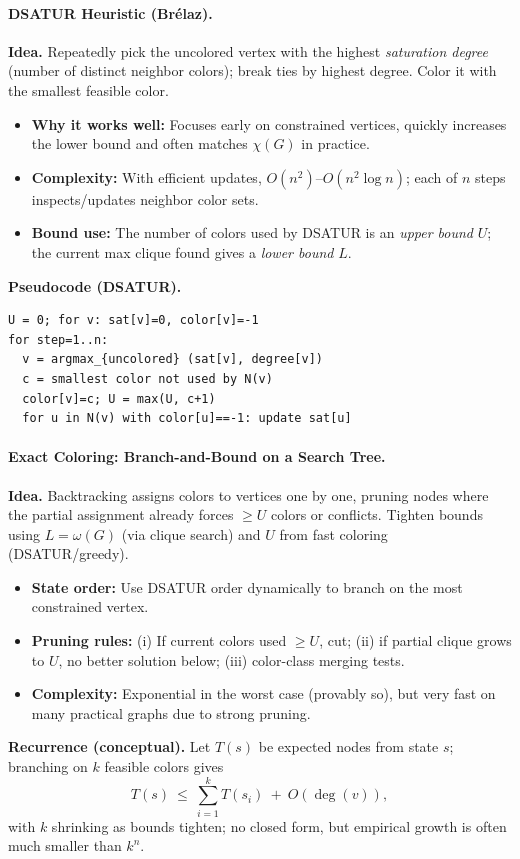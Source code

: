 \documentclass[9pt]{extarticle}
\begin{document}
\paragraph{DSATUR Heuristic (Brélaz).}
\textbf{Idea.} Repeatedly pick the uncolored vertex with the highest \emph{saturation degree} (number of distinct neighbor colors); break ties by highest degree. Color it with the smallest feasible color.
\begin{itemize}
  \item \textbf{Why it works well:} Focuses early on constrained vertices, quickly increases the lower bound and often matches $\chi(G)$ in practice.
  \item \textbf{Complexity:} With efficient updates, $O(n^2)$–$O(n^2 \log n)$; each of $n$ steps inspects/updates neighbor color sets.
  \item \textbf{Bound use:} The number of colors used by DSATUR is an \emph{upper bound} $U$; the current max clique found gives a \emph{lower bound} $L$.
\end{itemize}
\textbf{Pseudocode (DSATUR).}
\begin{verbatim}
U = 0; for v: sat[v]=0, color[v]=-1
for step=1..n:
  v = argmax_{uncolored} (sat[v], degree[v])
  c = smallest color not used by N(v)
  color[v]=c; U = max(U, c+1)
  for u in N(v) with color[u]==-1: update sat[u]
\end{verbatim}

\paragraph{Exact Coloring: Branch-and-Bound on a Search Tree.}
\textbf{Idea.} Backtracking assigns colors to vertices one by one, pruning nodes where the partial assignment already forces $\ge U$ colors or conflicts. Tighten bounds using $L=\omega(G)$ (via clique search) and $U$ from fast coloring (DSATUR/greedy).
\begin{itemize}
  \item \textbf{State order:} Use DSATUR order dynamically to branch on the most constrained vertex.
  \item \textbf{Pruning rules:} (i) If current colors used $\ge U$, cut; (ii) if partial clique grows to $U$, no better solution below; (iii) color-class merging tests.
  \item \textbf{Complexity:} Exponential in the worst case (provably so), but very fast on many practical graphs due to strong pruning.
\end{itemize}
\textbf{Recurrence (conceptual).} Let $T(s)$ be expected nodes from state $s$; branching on $k$ feasible colors gives
\[
T(s)\ \le\ \sum_{i=1}^k T(s_i)\ +\ O(\deg(v)),
\]
with $k$ shrinking as bounds tighten; no closed form, but empirical growth is often much smaller than $k^n$.
\end{document}
